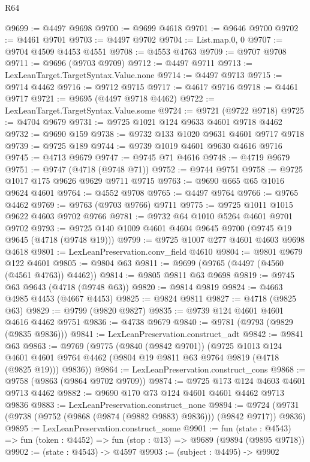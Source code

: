 \begin{lexlean}{R64}
\begin{coremodule}
@9699 := @4497 @9698
@9700 := @9699 @4618
@9701 := @9646 @9700
@9702 := @4461 @9701
@9703 := @4497 @9702
@9704 := List.map.{0, 0}
@9707 := @9704 @4509 @4453 @4551
@9708 := @4553 @4763
@9709 := @9707 @9708
@9711 := @9696 (@9703 @9709)
@9712 := @4497 @9711
@9713 := LexLeanTarget.TargetSyntax.Value.none
@9714 := @4497 @9713
@9715 := @9714 @4462
@9716 := @9712 @9715
@9717 := @4617 @9716
@9718 := @4461 @9717
@9721 := @9695 (@4497 @9718 @4462)
@9722 := LexLeanTarget.TargetSyntax.Value.some
@9724 := @9721 (@9722 @9718)
@9725 := @4704 @9679
@9731 := @9725 @1021 @124 @9633 @4601 @9718 @4462
@9732 := @9690 @159
@9738 := @9732 @133 @1020 @9631 @4601 @9717 @9718
@9739 := @9725 @189
@9744 := @9739 @1019 @4601 @9630 @4616 @9716
@9745 := @4713 @9679
@9747 := @9745 @71 @4616
@9748 := @4719 @9679
@9751 := @9747 (@4718 (@9748 @71))
@9752 := @9744 @9751
@9758 := @9725 @1017 @175 @9626 @9629 @9711 @9715
@9763 := @9690 @665 @65 @1016 @9624 @4601
@9764 := @4552 @9708
@9765 := @4497 @9764
@9766 := @9765 @4462
@9769 := @9763 (@9703 @9766) @9711
@9775 := @9725 @1011 @1015 @9622 @4603 @9702 @9766
@9781 := @9732 @64 @1010 @5264 @4601 @9701 @9702
@9793 := @9725 @140 @1009 @4601 @4604 @9645 @9700 (@9745 @19 @9645 (@4718 (@9748 @19)))
@9799 := @9725 @1007 @277 @4601 @4603 @9698 @4618
@9801 := LexLeanPreservation.conv_field @4610
@9804 := @9801 @9679 @122 @4601
@9805 := @9804 @63
@9811 := @9699 (@9765 (@4497 (@4560 (@4561 @4763)) @4462))
@9814 := @9805 @9811 @63 @9698
@9819 := @9745 @63 @9643 (@4718 (@9748 @63))
@9820 := @9814 @9819
@9824 := @4663 @4985 @4453 (@4667 @4453)
@9825 := @9824 @9811
@9827 := @4718 (@9825 @63)
@9829 := @9799 (@9820 @9827)
@9835 := @9739 @124 @4601 @4601 @4616 @4462 @9751
@9836 := @4738 @9679
@9840 := @9781 (@9793 (@9829 (@9835 @9836)))
@9841 := LexLeanPreservation.construct_adt
@9842 := @9841 @63
@9863 := @9769
    (@9775
      (@9840 (@9842 @9701))
      (@9725
        @1013
        @124
        @4601
        @4601
        @9764
        @4462
        (@9804 @19 @9811 @63 @9764 @9819 (@4718 (@9825 @19)))
        @9836))
@9864 := LexLeanPreservation.construct_cons
@9868 := @9758 (@9863 (@9864 @9702 @9709))
@9874 := @9725 @173 @124 @4603 @4601 @9713 @4462
@9882 := @9690 @170 @73 @124 @4601 @4601 @4462 @9713 @9836
@9883 := LexLeanPreservation.construct_none
@9894 := @9724 (@9731 (@9738 (@9752 (@9868 (@9874 (@9882 @9883) @9836))) (@9842 @9717)) @9836)
@9895 := LexLeanPreservation.construct_some
@9901 := fun (state : @4543) =>
  fun (token : @4452) => fun (stop : @13) => @9689 (@9894 (@9895 @9718))
@9902 := (state : @4543) -> @4597
@9903 := (subject : @4495) -> @9902

\end{coremodule}
\end{lexlean}
